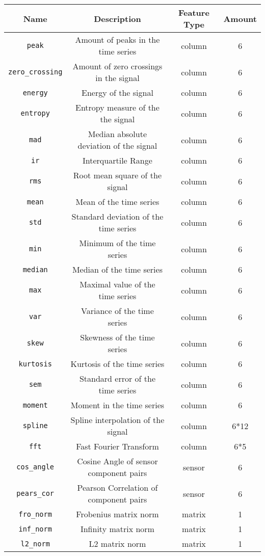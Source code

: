 \begin{center}
  \begin{longtable}{ | c | c | c | c | }
  \hline
  Name & Description & Feature Type & Amount \\
  \hline
  \endhead %
  \hline  
  \endfoot
  
    \texttt{peak} & Amount of peaks in the time series & column  & 6 \\
    \texttt{zero\_crossing} & Amount of zero crossings in the signal & column  & 6 \\ 
    \texttt{energy} & Energy of the signal & column  & 6 \\ 
    \texttt{entropy} & Entropy measure of the the signal & column  & 6 \\
    \texttt{mad} & Median absolute deviation of the signal & column  & 6 \\
    \texttt{ir} & Interquartile Range & column  & 6 \\
    \texttt{rms} & Root mean square of the signal & column  & 6 \\
    \texttt{mean} & Mean of the time series & column  & 6 \\
    \texttt{std} & Standard deviation of the time series & column  & 6 \\
    \texttt{min} & Minimum of the time series & column  & 6 \\
    \texttt{median} & Median of the time series & column  & 6 \\
    \texttt{max} & Maximal value of the time series & column  & 6 \\
    \texttt{var} & Variance of the time series & column  & 6 \\
    \texttt{skew} & Skewness of the time series & column  & 6 \\
    \texttt{kurtosis} & Kurtosis of the time series & column  & 6 \\
    \texttt{sem} & Standard error of the time series & column  & 6 \\
    \texttt{moment} & Moment in the time series & column & 6 \\
    \texttt{spline} & Spline interpolation of the signal & column  & 6*12 \\
    \texttt{fft} & Fast Fourier Transform & column  & 6*5 \\
  \hline
    \texttt{cos\_angle} & Cosine Angle of sensor component pairs & sensor & 6 \\
    \texttt{pears\_cor} & Pearson Correlation of component pairs & sensor & 6 \\
  \hline
    \texttt{fro\_norm} & Frobenius matrix norm & matrix & 1 \\
    \texttt{inf\_norm} & Infinity matrix norm & matrix & 1 \\
    \texttt{l2\_norm} & L2 matrix norm & matrix & 1 \\
    \hline
  \hline
  \end{longtable}
  \label{table:features}
\end{center}

